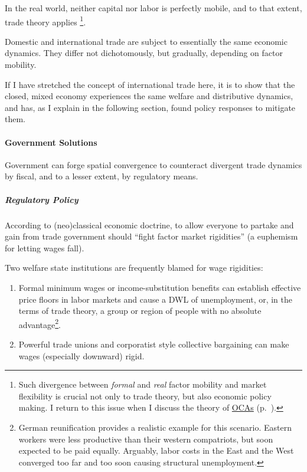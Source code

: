 In the real world, neither capital nor labor is perfectly mobile, and to that extent, trade theory applies \footnote{
	Such divergence between \emph{formal} and \emph{real} factor mobility and market flexibility is crucial not only to trade theory, but also economic policy making. I return to this issue when I discuss the theory of \hyperref[sec:OCA]{\glspl{OCA}} (p.~\pageref{sec:OCA}).}.

Domestic and international trade are subject to essentially the same economic dynamics. They differ not dichotomously, but gradually, depending on factor mobility.

If I have stretched the concept of international trade here, it is to show that the closed, mixed economy experiences the same welfare and distributive dynamics, and has, as I explain in the following section, found policy responses to mitigate them.

\paragraph{Government Solutions} Government can forge spatial convergence to counteract divergent trade dynamics by fiscal, and to a lesser extent, by regulatory means.

\subparagraph{Regulatory Policy} According to (neo)classical economic doctrine, to allow everyone to partake and gain from trade government should ``fight factor market rigidities'' (a euphemism for letting wages fall).

Two welfare state institutions are frequently blamed for wage rigidities:
\begin{enumerate}
	\item Formal minimum wages or income-substitution benefits can establish effective price floors in labor markets and cause a \gls{DWL} of unemployment, or, in the terms of trade theory, a group or region of people with no absolute advantage\footnote{
		German reunification provides a realistic example for this scenario. Eastern workers were less productive than their western compatriots, but soon expected to be paid equally. Arguably, labor costs in the East and the West converged too far and too soon causing structural unemployment.}.%
	\item Powerful trade unions and corporatist style collective bargaining can make wages (especially downward) rigid.
\end{enumerate}

